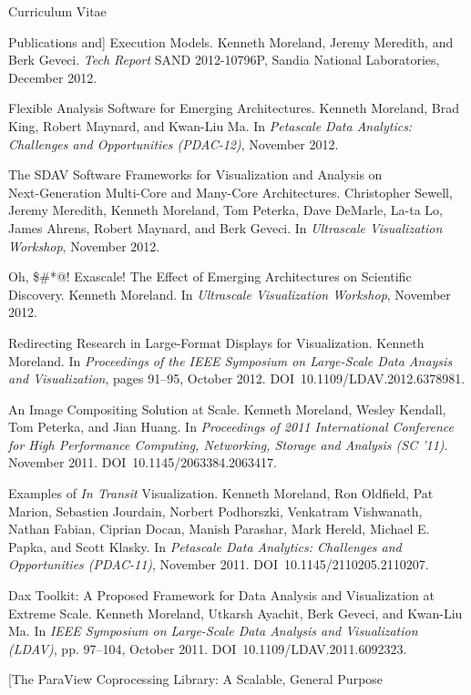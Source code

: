 \documentclass{article}
\begin{document}
\begin{cv}{Curriculum Vitae}
\begin{cvlist}{Publications}
      and] Execution Models. Kenneth Moreland, Jeremy Meredith, and Berk
      Geveci. \emph{Tech Report} SAND 2012-10796P, Sandia National
      Laboratories, December 2012.
    \item[Flexible Analysis Software for Emerging Architectures.] Kenneth
      Moreland, Brad King, Robert Maynard, and Kwan-Liu Ma. In
      \emph{Petascale Data Analytics: Challenges and Opportunities
        (PDAC-12)}, November 2012.
    \item[The SDAV Software Frameworks for Visualization and Analysis on]~\\
      Next-Generation Multi-Core and Many-Core Architectures. Christopher
      Sewell, Jeremy Meredith, Kenneth Moreland, Tom Peterka, Dave DeMarle,
      La-ta Lo, James Ahrens, Robert Maynard, and Berk Geveci. In
      \emph{Ultrascale Visualization Workshop}, November 2012.
    \item[Oh, \$\#*@!  Exascale!  The Effect of Emerging Architectures on
      Scientific] Discovery.  Kenneth Moreland.  In \emph{Ultrascale
      Visualization Workshop}, November 2012.
    \item[Redirecting Research in Large-Format Displays for Visualization.]
      Kenneth Moreland. In \emph{Proceedings of the IEEE Symposium on
        Large-Scale Data Anaysis and Visualization}, pages 91--95, October
      2012. DOI~10.1109/LDAV.2012.6378981.
    \item[An Image Compositing Solution at Scale.] Kenneth Moreland, Wesley
      Kendall, Tom Peterka, and Jian Huang. In \emph{Proceedings of 2011
        International Conference for High Performance Computing,
        Networking, Storage and Analysis (SC '11)}. November
      2011. DOI~10.1145/2063384.2063417.
    \item[Examples of \emph{In Transit} Visualization.] Kenneth Moreland,
      Ron Oldfield, Pat Marion, Sebastien Jourdain, Norbert Podhorszki,
      Venkatram Vishwanath, Nathan Fabian, Ciprian Docan, Manish Parashar,
      Mark Hereld, Michael E. Papka, and Scott Klasky. In \emph{Petascale
        Data Analytics: Challenges and Opportunities (PDAC-11)}, November
      2011. DOI~10.1145/2110205.2110207.
    \item[Dax Toolkit: A Proposed Framework for Data Analysis and
      Visualization at] Extreme Scale. Kenneth Moreland, Utkarsh Ayachit,
      Berk Geveci, and Kwan-Liu Ma. In \emph{IEEE Symposium on Large-Scale
        Data Analysis and Visualization (LDAV)}, pp. 97--104, October
      2011. DOI~10.1109/LDAV.2011.6092323.
    \item[The ParaView Coprocessing Library: A Scalable, General Purpose

\end{cvlist}
\end{cv}
\end{document}
